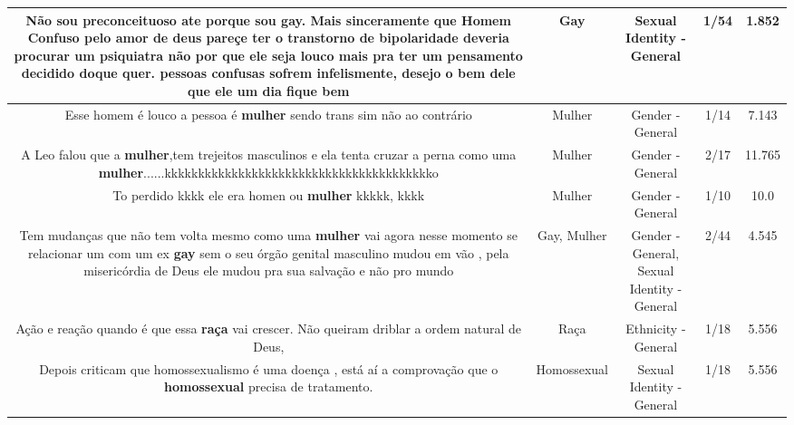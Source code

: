 \documentclass[11pt]{article}
\newlength\mylength
\begin{document}
\begin{center}
\begin{longtable}{|C{.65\mylength}|C{.30\mylength}|C{.12\mylength}|C{.12\mylength}|C{.12\mylength}|}
  \small Não sou preconceituoso ate porque sou \textbf{gay}. Mais sinceramente que Homem Confuso pelo amor de deus pareçe ter o transtorno de bipolaridade deveria procurar um psiquiatra não por que ele seja louco mais pra ter um pensamento decidido doque quer. pessoas confusas sofrem infelismente,   desejo o bem dele que ele um dia fique bem\normalsize   & Gay & Sexual Identity - General & 1/54 & 1.852 \\  \hline
  \small Esse homem é louco a pessoa é \textbf{mulher} sendo trans sim não ao contrário\normalsize   & Mulher & Gender - General & 1/14 & 7.143 \\  \hline
  \small A Leo falou que a \textbf{mulher},tem trejeitos masculinos e ela tenta cruzar a perna como uma \textbf{mulher}......kkkkkkkkkkkkkkkkkkkkkkkkkkkkkkkkkkkkkkkko\normalsize   & Mulher & Gender - General & 2/17 & 11.765 \\  \hline
  \small To perdido kkkk ele era homen ou \textbf{mulher} kkkkk, kkkk\normalsize   & Mulher & Gender - General & 1/10 & 10.0 \\  \hline
  \small Tem mudanças que não tem volta mesmo como uma \textbf{mulher} vai agora nesse momento se relacionar um com um ex \textbf{gay} sem o seu órgão genital masculino mudou em vão , pela misericórdia de Deus ele mudou pra sua salvação e não pro mundo\normalsize   & Gay, Mulher & Gender - General, Sexual Identity - General & 2/44 & 4.545 \\  \hline
  \small Ação e reação quando é que essa \textbf{raça} vai crescer. Não queiram driblar a ordem natural de Deus,\normalsize   & Raça & Ethnicity - General & 1/18 & 5.556 \\  \hline
  \small Depois criticam que homossexualismo é uma doença , está aí a comprovação que o \textbf{homossexual} precisa de tratamento.\normalsize   & Homossexual & Sexual Identity - General & 1/18 & 5.556 \\  \hline

\end{longtable}
\end{center}
\end{document}
